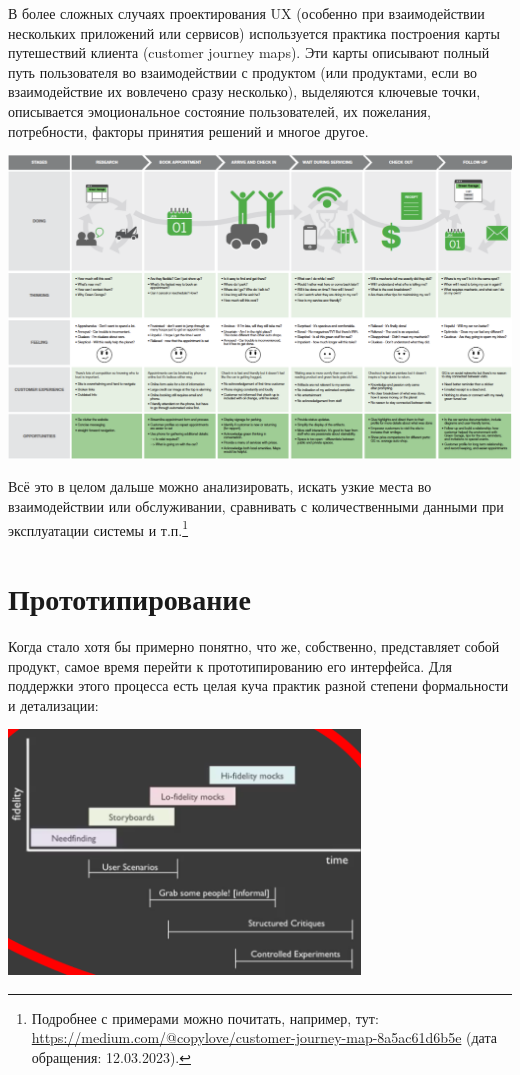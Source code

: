 \documentclass{../../text-style}
\begin{document}
В более сложных случаях проектирования UX (особенно при взаимодействии нескольких приложений или сервисов) используется практика построения карты путешествий клиента (customer journey maps). Эти карты описывают полный путь пользователя во взаимодействии с продуктом (или продуктами, если во взаимодействие их вовлечено сразу несколько), выделяются ключевые точки, описывается эмоциональное состояние пользователей, их пожелания, потребности, факторы принятия решений и многое другое. 

\begin{center}
    \includegraphics[width=\textwidth]{customerJourneyMaps.png}
\end{center}

Всё это в целом дальше можно анализировать, искать узкие места во взаимодействии или обслуживании, сравнивать с количественными данными при эксплуатации системы и т.п.\footnote{Подробнее с примерами можно почитать, например, тут: \url{https://medium.com/@copylove/customer-journey-map-8a5ac61d6b5e} (дата обращения: 12.03.2023).}

\section{Прототипирование}

Когда стало хотя бы примерно понятно, что же, собственно, представляет собой продукт, самое время перейти к прототипированию его интерфейса. Для поддержки этого процесса есть целая куча практик разной степени формальности и детализации:

\begin{center}
    \includegraphics[width=0.7\textwidth]{prototypingTechniques.png}
\end{center}
\end{document}
